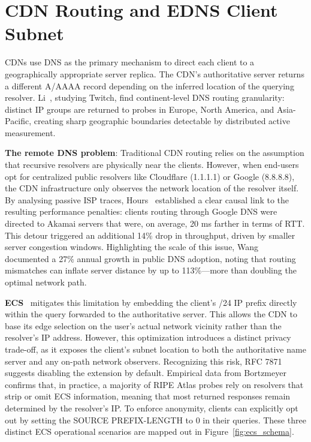 \section{CDN Routing and EDNS Client Subnet}
\label{sec:2.5}

\ac{CDN}s use \ac{DNS} as the primary mechanism to direct each client to a geographically appropriate server replica. The \ac{CDN}’s authoritative server returns a different \ac{A}/\ac{AAAA} record depending on the inferred location of the querying resolver. Li~\cite{Li2025}, studying Twitch, find continent-level \ac{DNS} routing granularity: distinct \ac{IP} groups are returned to probes in Europe, North America, and Asia-Pacific, creating sharp geographic boundaries detectable by distributed active measurement.

\textbf{The remote \ac{DNS} problem}: Traditional \ac{CDN} routing relies on the assumption that recursive resolvers are physically near the clients. However, when end-users opt for centralized public resolvers like Cloudflare (1.1.1.1) or Google (8.8.8.8), the \ac{CDN} infrastructure only observes the network location of the resolver itself. By analysing passive \ac{ISP} traces, Hours~\cite{Hours2016} established a clear causal link to the resulting performance penalties: clients routing through Google \ac{DNS} were directed to Akamai servers that were, on average, 20 ms farther in terms of \ac{RTT}. This detour triggered an additional 14\% drop in throughput, driven by smaller server congestion windows. Highlighting the scale of this issue, Wang~\cite{Wang2018} documented a 27\% annual growth in public \ac{DNS} adoption, noting that routing mismatches can inflate server distance by up to 113\%—more than doubling the optimal network path.

\textbf{\ac{ECS}}~\cite{RFC7871} mitigates this limitation by embedding the client’s /24 \ac{IP} prefix directly within the query forwarded to the authoritative server. This allows the \ac{CDN} to base its edge selection on the user's actual network vicinity rather than the resolver's \ac{IP} address. However, this optimization introduces a distinct privacy trade-off, as it exposes the client’s subnet location to both the authoritative name server and any on-path network observers. Recognizing this risk, RFC 7871~\cite{RFC7871} suggests disabling the extension by default. Empirical data from Bortzmeyer~\cite{Bortzmeyer_tutorial} confirms that, in practice, a majority of RIPE Atlas probes rely on resolvers that strip or omit \ac{ECS} information, meaning that most returned responses remain determined by the resolver's \ac{IP}. To enforce anonymity, clients can explicitly opt out by setting the SOURCE PREFIX-LENGTH to 0 in their queries. These three distinct \ac{ECS} operational scenarios are mapped out in Figure~\ref{fig:ecs_schema}.

